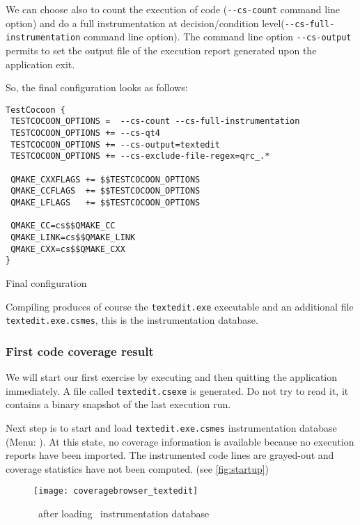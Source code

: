We can choose also to count the execution of code (\verb$--cs-count$ command line
option) and do a full instrumentation at decision/condition
level(\verb$--cs-full-instrumentation$ command line option). The command line
option \verb$--cs-output$ permits to set the output file of the execution
report generated upon the application exit.



So, the final {\TestCocoon} configuration looks as follows:
\begin{listings}[H]
\begin{verbatim}
TestCocoon {
 TESTCOCOON_OPTIONS =  --cs-count --cs-full-instrumentation
 TESTCOCOON_OPTIONS += --cs-qt4
 TESTCOCOON_OPTIONS += --cs-output=textedit
 TESTCOCOON_OPTIONS += --cs-exclude-file-regex=qrc_.*

 QMAKE_CXXFLAGS += $$TESTCOCOON_OPTIONS
 QMAKE_CCFLAGS  += $$TESTCOCOON_OPTIONS
 QMAKE_LFLAGS   += $$TESTCOCOON_OPTIONS

 QMAKE_CC=cs$$QMAKE_CC
 QMAKE_LINK=cs$$QMAKE_LINK
 QMAKE_CXX=cs$$QMAKE_CXX
}
\end{verbatim}
\caption{Final {\qmake} configuration}
\label{lst:qmake2}
\end{listings}

Compiling {\TextEdit} produces of course the \texttt{textedit.exe} executable and an additional file
\texttt{textedit.exe.csmes}, this is the  instrumentation database.

\subsubsection{First code coverage result}

We will start our first exercise by executing {\TextEdit} and then quitting the application immediately. A file called
\texttt{textedit.csexe} is generated.  Do not try to read it, it contains a binary
snapshot of the last execution run.

\sloppy Next step is to  start {\CoverageBrowser} and load \texttt{textedit.exe.csmes} instrumentation database
(Menu: ).  At this state, no coverage information is available
because no execution reports have been  imported. The instrumented code lines are
grayed-out and coverage statistics have not been computed. (see \autoref{fig:startup})

\begin{figure}[H]
  \begin{center}
    \texttt{[image: coveragebrowser\_textedit]}
  \end{center}
  \caption{\CoverageBrowser\ after loading \TextEdit\ instrumentation database}
  \label{fig:startup}
\end{figure}

